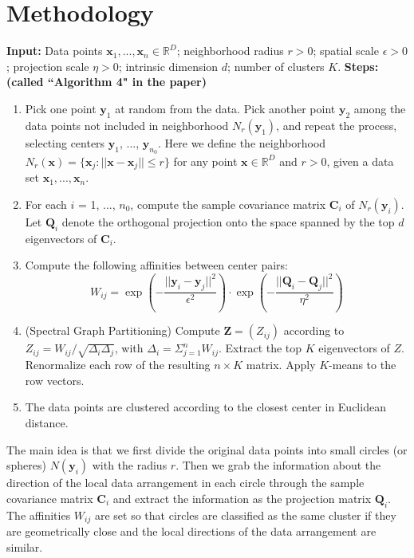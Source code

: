 \section{Methodology}
\vspace{0.1in}
\textbf{Input:} \newline
Data points $\boldsymbol{x}_1, ..., \boldsymbol{x}_n \in \mathbb{R}^D$; neighborhood radius $r>0$; spatial scale $\epsilon>0$; projection scale $\eta>0$; intrinsic dimension $d$; number of clusters $K$. \vspace{0.1in} \newline
\textbf{Steps:  (called ``Algorithm 4" in the paper)}
\begin{enumerate}
\item Pick one point $\boldsymbol{y}_1$ at random from the data.
Pick another point $\boldsymbol{y}_2$ among the data points not included in neighborhood $N_r(\boldsymbol{y}_1)$, and repeat the process, selecting centers $\boldsymbol{y}_1$, ..., $\boldsymbol{y}_{n_0}$.
Here we define the neighborhood $N_r(\boldsymbol{x})=\{\boldsymbol{x}_j : ||\boldsymbol{x}-\boldsymbol{x}_j|| \leqslant r\}$ for any point $\boldsymbol{x} \in \mathbb{R}^D$ and $r>0$, given a data set $\boldsymbol{x}_1, ..., \boldsymbol{x}_n$.
\item For each $i$ = 1, ..., $n_0$, compute the sample covariance matrix $\boldsymbol{C}_i$ of $N_r(\boldsymbol{y}_i)$.
Let $\boldsymbol{Q}_i$ denote the orthogonal projection onto the space spanned by the top $d$ eigenvectors of $\boldsymbol{C}_i$.
\item Compute the following affinities between center pairs:
\begin{equation}
W_{ij}=\exp \left( -\frac{||\boldsymbol{y}_i-\boldsymbol{y}_j||^2}{\epsilon^2} \right) \cdot \exp \left(-\frac{||\boldsymbol{Q}_i-\boldsymbol{Q}_j||^2}{\eta^2} \right)
\end{equation}
\item (Spectral Graph Partitioning) Compute $\boldsymbol{Z} = (Z_{ij})$ according to $Z_{ij} = W_{ij}/\sqrt{\Delta_i \Delta_j}$, with $\Delta_i=\Sigma_{j=1}^{n} W_{ij}$.
Extract the top $K$ eigenvectors of $Z$.
Renormalize each row of the resulting $n \times K$ matrix.
Apply $K$-means to the row vectors.
\item The data points are clustered according to the closest center in Euclidean distance.
\end{enumerate}
\vspace{1em}
The main idea is that we first divide the original data points into small circles (or spheres) $N(\boldsymbol{y}_i)$ with the radius $r$.
Then we grab the information about the direction of the local data arrangement in each circle through the sample covariance matrix $\boldsymbol{C}_i$ and extract the information as the projection matrix $\boldsymbol{Q}_i$.
The affinities $W_{ij}$ are set so that circles are classified as the same cluster if they are geometrically close and the local directions of the data arrangement are similar.

